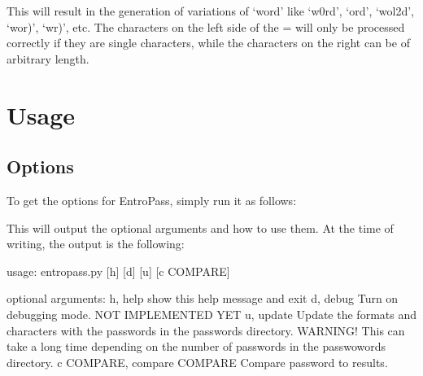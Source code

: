 \documentclass[letterpaper,10pt,english]{sphinxmanual}
\begin{document}
\begin{sphinxVerbatim}[commandchars=\\\{\}]
  \PYG{p}{[}\PYG{p}{]}
  \PYG{p}{[} \PYG{p}{]}
  \PYG{p}{[}\PYG{p}{]}
  \PYG{p}{[}\PYG{p}{]}
\end{sphinxVerbatim}

\sphinxAtStartPar
This will result in the generation of variations of ‘word’ like ‘w0rd’, ‘ord’, ‘wol2d’, ‘wor)’, ‘wr)’, etc.
The characters on the left side of the = will only be processed correctly if they are single characters, while the characters on the right can be of arbitrary length.


\section{Usage}
\label{\detokenize{usage:usage}}

\subsection{Options}
\label{\detokenize{usage:options}}
\sphinxAtStartPar
To get the options for EntroPass, simply run it as follows:

\begin{sphinxVerbatim}[commandchars=\\\{\}]
 
\end{sphinxVerbatim}

\sphinxAtStartPar
This will output the optional arguments and how to use them. At the time of writing, the output is the following:

\begin{sphinxVerbatim}[commandchars=\\\{\}]
usage: entropass.py [\PYGZhy{}h] [\PYGZhy{}d] [\PYGZhy{}u] [\PYGZhy{}c COMPARE]

optional arguments:
\PYGZhy{}h, \PYGZhy{}\PYGZhy{}help            show this help message and exit
\PYGZhy{}d, \PYGZhy{}\PYGZhy{}debug           Turn on debugging mode. NOT IMPLEMENTED YET
\PYGZhy{}u, \PYGZhy{}\PYGZhy{}update          Update the formats and characters with the passwords
                      in the passwords directory. WARNING! This can take a
                      long time depending on the number of passwords in the
                      passwowords directory.
\PYGZhy{}c COMPARE, \PYGZhy{}\PYGZhy{}compare COMPARE
                      Compare password to results.
\end{sphinxVerbatim}
\end{document}
